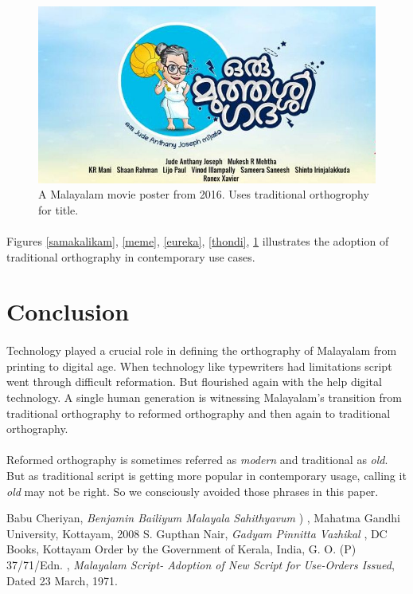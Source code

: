 \documentclass[10pt]{article}
\begin{document}
\begin{figure}[H]
 \centering
  \includegraphics[scale=0.4]{images/2016-oru-muthashi-gadha}
 \caption{A Malayalam movie poster from 2016. Uses traditional orthogrophy for title.}
 \label{muthassi}
\end{figure}

\paragraph{}Figures \ref{samakalikam}, \ref{meme}, \ref{eureka}, \ref{thondi}, \ref{muthassi} illustrates the adoption of traditional orthography in contemporary use cases.

\section{Conclusion}
\paragraph{}
Technology played a crucial role in defining the orthography of Malayalam from printing to digital age. When technology like typewriters had limitations script went through difficult reformation. But flourished again with the help digital technology. A single human generation is witnessing Malayalam's transition from traditional orthography to reformed orthography and then again to traditional orthography. 
\paragraph{}
Reformed orthography is sometimes referred as \textit{modern} and traditional as \textit{old}. But as traditional script is getting more popular in contemporary usage, calling it \textit{old} may not be right. So we consciously avoided those phrases in this paper.

\begin{thebibliography}{9}

 Babu Cheriyan, \textit{Benjamin Bailiyum Malayala Sahithyavum} {) }, Mahatma Gandhi University, Kottayam, 2008
 S. Gupthan Nair, \textit{Gadyam Pinnitta Vazhikal}{ }, DC Books, Kottayam
 Order by the Government of Kerala, India, G. O. (P) 37/71/Edn. , \textit{Malayalam Script- Adoption of New Script for Use-Orders Issued}, Dated 23 March, 1971.

\end{thebibliography}
\end{document}
